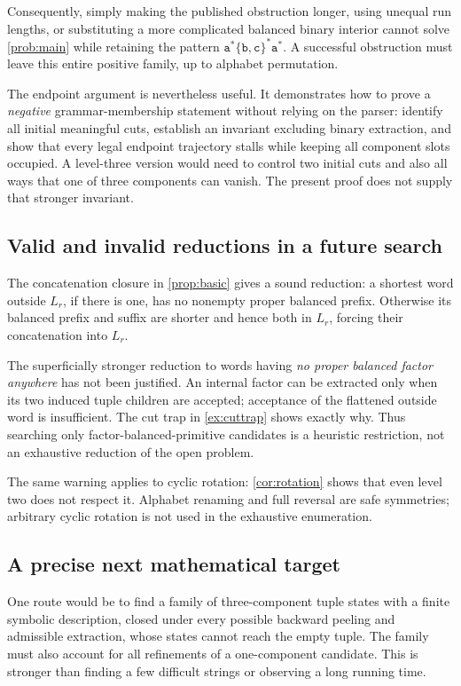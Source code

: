\documentclass[11pt,letterpaper]{article}
\numberwithin{equation}{section}
\theoremstyle{definition}
\theoremstyle{remark}
\renewcommand{\aa}{\mathtt a}
\newcommand{\bb}{\mathtt b}
\newcommand{\cc}{\mathtt c}
\begin{document}
Consequently, simply making the published obstruction longer, using
unequal run lengths, or substituting a more complicated balanced
binary interior cannot solve \cref{prob:main} while retaining the
pattern \(\aa^*\{\bb,\cc\}^*\aa^*\). A successful obstruction must
leave this entire positive family, up to alphabet permutation.

The endpoint argument is nevertheless useful. It demonstrates how to
prove a \emph{negative} grammar-membership statement without relying
on the parser: identify all initial meaningful cuts, establish an
invariant excluding binary extraction, and show that every legal
endpoint trajectory stalls while keeping all component slots
occupied. A level-three version would need to control two initial
cuts and also all ways that one of three components can vanish.
The present proof does not supply that stronger invariant.

\subsection{Valid and invalid reductions in a future search}
The concatenation closure in \cref{prop:basic} gives a sound reduction:
a shortest word outside \(L_r\), if there is one, has no nonempty
proper balanced prefix. Otherwise its balanced prefix and suffix are
shorter and hence both in \(L_r\), forcing their concatenation into
\(L_r\).

The superficially stronger reduction to words having \emph{no proper
balanced factor anywhere} has not been justified. An internal factor
can be extracted only when its two induced tuple children are
accepted; acceptance of the flattened outside word is insufficient.
The cut trap in \cref{ex:cuttrap} shows exactly why. Thus searching
only factor-balanced-primitive candidates is a heuristic restriction,
not an exhaustive reduction of the open problem.

The same warning applies to cyclic rotation: \cref{cor:rotation}
shows that even level two does not respect it. Alphabet renaming and
full reversal are safe symmetries; arbitrary cyclic rotation is not
used in the exhaustive enumeration.

\subsection{A precise next mathematical target}
One route would be to find a family of three-component tuple states
with a finite symbolic description, closed under every possible
backward peeling and admissible extraction, whose states cannot
reach the empty tuple. The family must also account for all
refinements of a one-component candidate. This is stronger than
finding a few difficult strings or observing a long running time.
\end{document}
